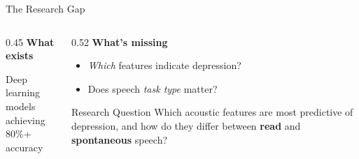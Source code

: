 \documentclass[aspectratio=169,11pt]{beamer}
\begin{document}
\begin{frame}{The Research Gap}
    \begin{columns}[T]
        \begin{column}{0.45\textwidth}
            \textbf{\color{darkgrey}\faCheckCircle\hspace{0.3em} What exists}
            
            \vspace{0.3cm}
            
            Deep learning models\\achieving 80\%+ accuracy
            
            \vspace{0.5cm}
            
            \begin{center}
            \end{center}
        \end{column}
        
        \begin{column}{0.52\textwidth}
            \textbf{\color{accentblue}\faQuestionCircle\hspace{0.3em} What's missing}
            
            \vspace{0.3cm}
            
            \begin{itemize}
                \item \textit{Which} features indicate depression?
                \item Does speech \textit{task type} matter?
            \end{itemize}
            
            \vspace{0.5cm}
            
            \begin{block}{Research Question}
                \small Which acoustic features are most predictive of depression, and how do they differ between \textbf{read} and \textbf{spontaneous} speech?
            \end{block}
        \end{column}
    \end{columns}
\end{frame}
\end{document}

